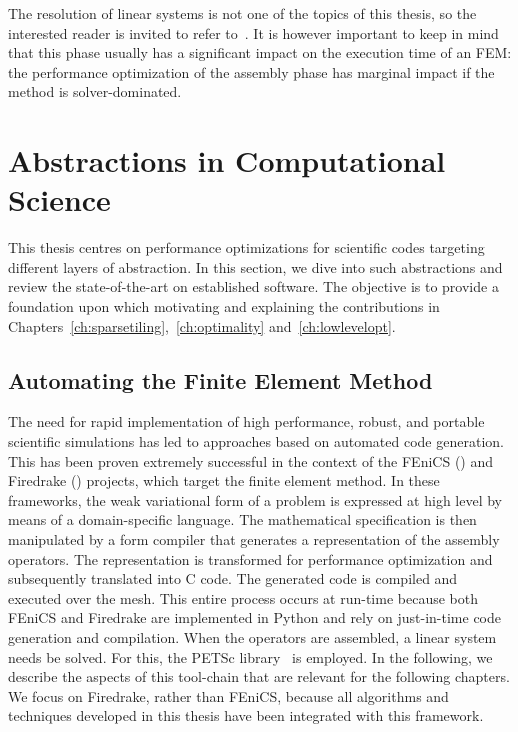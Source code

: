 The resolution of linear systems is not one of the topics of this thesis, so the interested reader is invited to refer to~\cite{good-linear-system-source}. It is however important to keep in mind that this phase usually has a significant impact on the execution time of an FEM: the performance optimization of the assembly phase has marginal impact if the method is solver-dominated. 




\section{Abstractions in Computational Science}
\label{sec:bkg:abstractions}

This thesis centres on performance optimizations for scientific codes targeting different layers of abstraction. In this section, we dive into such abstractions and review the state-of-the-art on established software. The objective is to provide a foundation upon which motivating and explaining the contributions in Chapters~\ref{ch:sparsetiling},~\ref{ch:optimality} and~\ref{ch:lowlevelopt}.



\subsection{Automating the Finite Element Method}
\label{sec:bkg:fenics-and-firedrake}

The need for rapid implementation of high performance, robust, and portable scientific simulations has led to approaches based on automated code generation. This has been proven extremely successful in the context of the FEniCS (\cite{Fenics}) and Firedrake (\cite{firedrake-paper}) projects, which target the finite element method. In these frameworks, the weak variational form of a problem is expressed at high level by means of a domain-specific language. The mathematical specification is then manipulated by a form compiler that generates a representation of the assembly operators. The representation is transformed for performance optimization and subsequently translated into C code. The generated code is compiled and executed over the mesh. This entire process occurs at run-time because both FEniCS and Firedrake are implemented in Python and rely on just-in-time code generation and compilation. When the operators are assembled, a linear system needs be solved. For this, the PETSc library~\cite{petsc-cite} is employed. In the following, we describe the aspects of this tool-chain that are relevant for the following chapters. We focus on Firedrake, rather than FEniCS, because all algorithms and techniques developed in this thesis have been integrated with this framework.

